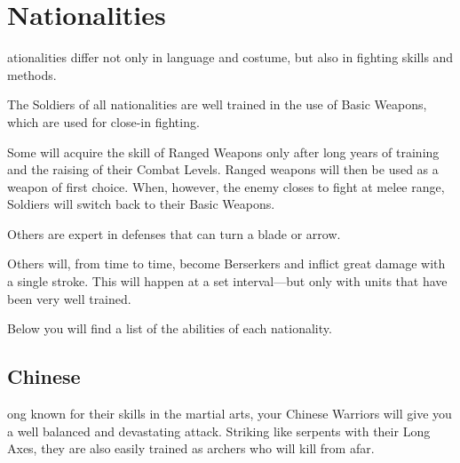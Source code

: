 
\chapter{Nationalities}

ationalities differ not only in language and costume, but also in fighting skills and methods.

The Soldiers of all nationalities are well trained in the use of Basic Weapons, which are used for close-in fighting.

Some will acquire the skill of Ranged Weapons only after long years of training and the raising of their Combat Levels. Ranged weapons will then be used as a weapon of first choice. When, however, the enemy closes to fight at melee range, Soldiers will switch back to their Basic Weapons.

Others are expert in defenses that can turn a blade or arrow.

Others will, from time to time, become Berserkers and inflict great damage with a single stroke. This will happen at a set interval---but only with units that have been very well trained.

Below you will find a list of the abilities of each nationality.

\clearpage %

\section{Chinese}


ong known for their skills in the martial arts, your Chinese Warriors will give you a well balanced and devastating attack. Striking like serpents with their Long Axes, they are also easily trained as archers who will kill from afar.

